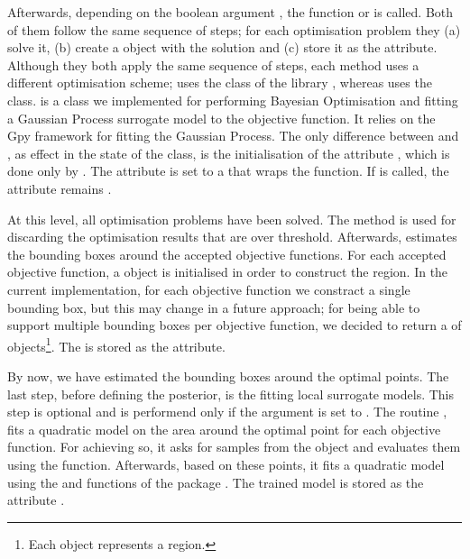 Afterwards, depending on the boolean argument
, the function 
or  is called. Both of them follow the same
sequence of steps; for each optimisation problem they (a) solve it,
(b) create a  object with the solution
and (c) store it as the 
attribute. Although they both apply the same sequence of steps, each
method uses a different optimisation scheme;
 uses the  class of the
 library \autocite{2020SciPy-NMeth}, whereas
 uses the  class.
 is a class we implemented for performing
Bayesian Optimisation and fitting a Gaussian Process surrogate model
to the objective function. It relies on the Gpy framework
\autocite{gpy2014} for fitting the Gaussian Process. The only
difference between  and ,
as effect in the state of the  class, is
the initialisation of the attribute
, which is done only by
. The attribute is set to a  that
wraps the  function. If
 is called, the attribute remains
.

At this level, all optimisation problems have been solved. The method
 is used for discarding the optimisation
results that are over threshold. Afterwards, 
estimates the bounding boxes around the accepted objective
functions. For each accepted objective function, a
 object is initialised in order to
construct the region. In the current implementation, for each
objective function we constract a single bounding box, but this may
change in a future approach; for being able to support multiple
bounding boxes per objective function, we decided to return a
 of  objects\footnote{Each
   object represents a region.}. The
 is stored as the 
attribute.

By now, we have estimated the bounding boxes around the optimal
points. The last step, before defining the posterior, is the fitting
local surrogate models. This step is optional and is performend only
if the argument  is set to . The
routine , fits a quadratic model on the area
around the optimal point for each objective function. For achieving
so, it asks for samples from the  object and
evaluates them using the 
function. Afterwards, based on these points, it fits a quadratic model
using the  and
 functions of the
 package \autocite{scikit-learn}. The trained
model is stored as the attribute
.


